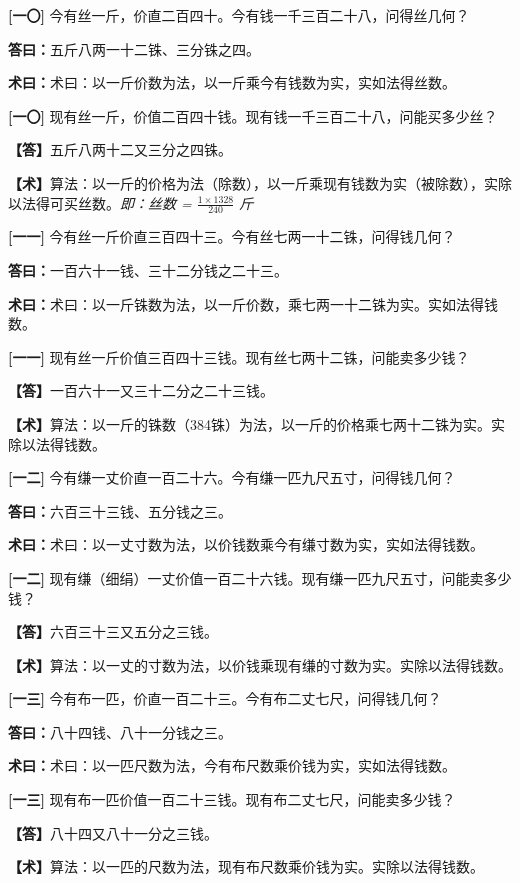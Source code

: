 \documentclass[10pt,a4paper]{article}
\newlength{\lw}
\newlength{\rw}
\newcommand{\bilingc}[2]{%
  \par\vspace{0.1em}%
  \noindent\begin{minipage}[t]{\lw}
  {\small #1}
  \end{minipage}%
  \hfill%
  \begin{minipage}[t]{\rw}
  {\small #2}
  \end{minipage}%
  \vspace{0.1em}%
}
\newcommand{\da}{\textbf{\textcolor{answercolor}{答曰：}}}
\newcommand{\daB}{\textbf{\textcolor{answercolor}{【答】}}}
\newcommand{\shu}{\textbf{\textcolor{methodcolor}{术曰：}}}
\newcommand{\shuB}{\textbf{\textcolor{methodcolor}{【术】}}}
\newcommand{\pn}[1]{\textbf{[#1]}}
\begin{document}
\bilingc{
\pn{一〇} 今有丝一斤，价直二百四十。今有钱一千三百二十八，问得丝几何？

\da 五斤八两一十二铢、三分铢之四。

\shu 术曰：以一斤价数为法，以一斤乘今有钱数为实，实如法得丝数。
}{
\pn{一〇} 现有丝一斤，价值二百四十钱。现有钱一千三百二十八，问能买多少丝？

\daB 五斤八两十二又三分之四铢。

\shuB 算法：以一斤的价格为法（除数），以一斤乘现有钱数为实（被除数），实除以法得可买丝数。\textit{即：丝数 = $\frac{1\times1328}{240}$ 斤}
}

\vspace{0.3em}

\bilingc{
\pn{一一} 今有丝一斤价直三百四十三。今有丝七两一十二铢，问得钱几何？

\da 一百六十一钱、三十二分钱之二十三。

\shu 术曰：以一斤铢数为法，以一斤价数，乘七两一十二铢为实。实如法得钱数。
}{
\pn{一一} 现有丝一斤价值三百四十三钱。现有丝七两十二铢，问能卖多少钱？

\daB 一百六十一又三十二分之二十三钱。

\shuB 算法：以一斤的铢数（384铢）为法，以一斤的价格乘七两十二铢为实。实除以法得钱数。
}

\vspace{0.3em}

\bilingc{
\pn{一二} 今有缣一丈价直一百二十六。今有缣一匹九尺五寸，问得钱几何？

\da 六百三十三钱、五分钱之三。

\shu 术曰：以一丈寸数为法，以价钱数乘今有缣寸数为实，实如法得钱数。
}{
\pn{一二} 现有缣（细绢）一丈价值一百二十六钱。现有缣一匹九尺五寸，问能卖多少钱？

\daB 六百三十三又五分之三钱。

\shuB 算法：以一丈的寸数为法，以价钱乘现有缣的寸数为实。实除以法得钱数。
}

\vspace{0.3em}

\bilingc{
\pn{一三} 今有布一匹，价直一百二十三。今有布二丈七尺，问得钱几何？

\da 八十四钱、八十一分钱之三。

\shu 术曰：以一匹尺数为法，今有布尺数乘价钱为实，实如法得钱数。
}{
\pn{一三} 现有布一匹价值一百二十三钱。现有布二丈七尺，问能卖多少钱？

\daB 八十四又八十一分之三钱。

\shuB 算法：以一匹的尺数为法，现有布尺数乘价钱为实。实除以法得钱数。
}
\end{document}
